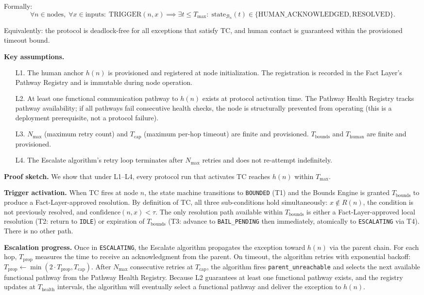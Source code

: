 Formally:
\[
\forall n \in \text{nodes},\; \forall x \in \text{inputs}:\;
\text{TRIGGER}(n, x) \implies
\exists t \leq T_{\max}:\;
\text{state}_{\mathcal{B}_n}(t) \in \{\text{HUMAN\_ACKNOWLEDGED}, \text{RESOLVED}\}.
\tag{L}
\]

Equivalently: the protocol is deadlock-free for all exceptions that satisfy TC, and human contact is guaranteed within the provisioned timeout bound.

\medskip\noindent\textbf{Key assumptions.}
\begin{itemize}\itemsep=0pt
\item[L1.] The human anchor $h(n)$ is provisioned and registered at node initialization. The registration is recorded in the Fact Layer's Pathway Registry and is immutable during node operation.
\item[L2.] At least one functional communication pathway to $h(n)$ exists at protocol activation time. The Pathway Health Registry tracks pathway availability; if all pathways fail consecutive health checks, the node is structurally prevented from operating (this is a deployment prerequisite, not a protocol failure).
\item[L3.] $N_{\max}$ (maximum retry count) and $T_{\text{cap}}$ (maximum per-hop timeout) are finite and provisioned. $T_{\text{bounds}}$ and $T_{\text{human}}$ are finite and provisioned.
\item[L4.] The Escalate algorithm's retry loop terminates after $N_{\max}$ retries and does not re-attempt indefinitely.
\end{itemize}

\medskip\noindent\textbf{Proof sketch.}
We show that under L1--L4, every protocol run that activates TC reaches $h(n)$ within $T_{\max}$.

\textbf{Trigger activation.} When TC fires at node $n$, the state machine transitions to \texttt{BOUNDED} (T1) and the Bounds Engine is granted $T_{\text{bounds}}$ to produce a Fact-Layer-approved resolution. By definition of TC, all three sub-conditions hold simultaneously: $x \notin R(n)$, the condition is not previously resolved, and $\text{confidence}(n, x) < \tau$. The only resolution path available within $T_{\text{bounds}}$ is either a Fact-Layer-approved local resolution (T2: return to \texttt{IDLE}) or expiration of $T_{\text{bounds}}$ (T3: advance to \texttt{BAIL\_PENDING} then immediately, atomically to \texttt{ESCALATING} via T4). There is no other path.

\textbf{Escalation progress.} Once in \texttt{ESCALATING}, the Escalate algorithm propagates the exception toward $h(n)$ via the parent chain. For each hop, $T_{\text{prop}}$ measures the time to receive an acknowledgment from the parent. On timeout, the algorithm retries with exponential backoff: $T_{\text{prop}} \leftarrow \min(2 \cdot T_{\text{prop}}, T_{\text{cap}})$. After $N_{\max}$ consecutive retries at $T_{\text{cap}}$, the algorithm fires \texttt{parent\_unreachable} and selects the next available functional pathway from the Pathway Health Registry. Because L2 guarantees at least one functional pathway exists, and the registry updates at $T_{\text{health}}$ intervals, the algorithm will eventually select a functional pathway and deliver the exception to $h(n)$.

